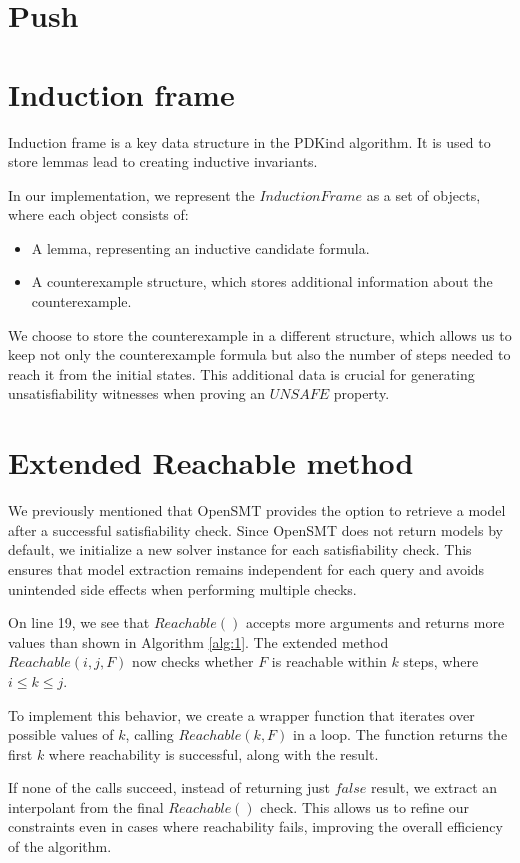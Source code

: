 \section{Push}
\section*{Induction frame}
\noindent Induction frame is a key data structure in the PDKind algorithm. It is used to store lemmas lead to creating inductive invariants.

In our implementation, we represent the \( Induction Frame \) as a set of objects, where each object consists of:
\begin{itemize}
    \item A lemma, representing an inductive candidate formula.
    \item A counterexample structure, which stores additional information about the counterexample.
\end{itemize}
We choose to store the counterexample in a different structure, which allows us to keep not only the counterexample formula but also the number of steps needed to reach it from the initial states. This additional data is crucial for generating unsatisfiability witnesses when proving an \( UNSAFE \) property.

\section*{Extended Reachable method}
\noindent We previously mentioned that OpenSMT\cite{OpenSMT} provides the option to retrieve a model after a successful satisfiability check. Since OpenSMT does not return models by default, we initialize a new solver instance for each satisfiability check. This ensures that model extraction remains independent for each query and avoids unintended side effects when performing multiple checks.

On line 19, we see that \( Reachable() \) accepts more arguments and returns more values than shown in Algorithm \ref{alg:1}. The extended method $Reachable(i, j, F)$ now checks whether \( F \) is reachable within \( k \) steps, where \( i \leq k \leq j \).

To implement this behavior, we create a wrapper function that iterates over possible values of \( k \), calling $Reachable(k, F)$ in a loop. The function returns the first \( k \) where reachability is successful, along with the result.

If none of the calls succeed, instead of returning just \( false \) result, we extract an interpolant from the final \( Reachable() \) check. This allows us to refine our constraints even in cases where reachability fails, improving the overall efficiency of the algorithm.

